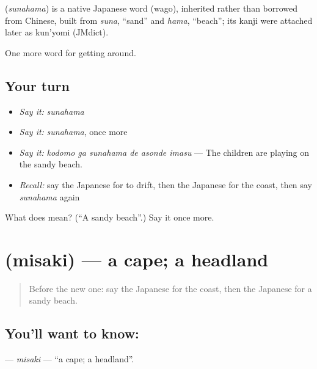 \begin{cousinweb}
\textbf{} (\emph{sunahama}) is a native Japanese word (wago), inherited rather than borrowed from Chinese, built from \emph{suna}, \textquotedblleft{}sand\textquotedblright{} and \emph{hama}, \textquotedblleft{}beach\textquotedblright{}; its kanji were attached later as kun'yomi (JMdict).
\end{cousinweb}

\begin{grammarlens}[title={What you've built}]
One more word for getting around.
\end{grammarlens}

\subsection*{Your turn}
\begin{itemize}
\raggedright
  \item \emph{Say it:} \emph{sunahama}
  \item \emph{Say it:} \emph{sunahama}, once more
  \item \emph{Say it:} \emph{kodomo ga sunahama de asonde imasu} — The children are playing on the sandy beach.
  \item \emph{Recall:} say the Japanese for to drift, then the Japanese for the coast, then say \emph{sunahama} again
\end{itemize}

\begin{tcolorbox}[breakable,colback=teal!4,colframe=teal!35!black,title={Before you move on}]
What does  mean? (\textquotedblleft{}A sandy beach\textquotedblright{}.) Say it once more.
\end{tcolorbox}
\section[\texorpdfstring{\ja{みさき} (misaki)}{みさき (misaki)}]{ (misaki) — a cape; a headland}

\label{lesson:JA-C382-misaki}



\begin{quote}
Before the new one: say the Japanese for the coast, then the Japanese for a sandy beach.
\end{quote}

\subsection*{You'll want to know: }
\textbf{} — \emph{misaki} — \textquotedblleft{}a cape; a headland\textquotedblright{}.

